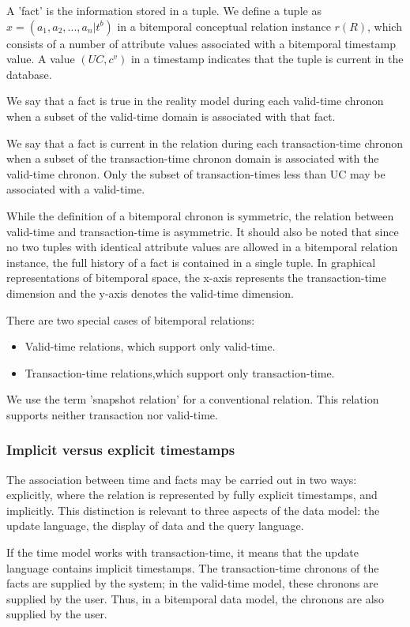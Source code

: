 A 'fact' is the information stored in a tuple. We define a tuple as $x=(a_1,a_2,...,a_n|t^b)$ in a bitemporal conceptual relation instance $r(R)$, which consists of a number of attribute values associated with a bitemporal timestamp value. A value $(UC,c^v)$ in a timestamp indicates that the tuple is current in the database.

We say that a fact is true in the reality model during each valid-time chronon when a subset of the valid-time domain is associated with that fact.

We say that a fact is current in the relation during each transaction-time chronon when a subset of the transaction-time chronon domain is associated with the valid-time chronon. Only the subset of transaction-times less than UC may be associated with a valid-time.

While the definition of a bitemporal chronon is symmetric, the relation between valid-time and transaction-time is asymmetric. It should also be noted that since no two tuples with identical attribute values are allowed in a bitemporal relation instance, the full history of a fact is contained in a single tuple. In graphical representations of bitemporal space, the x-axis represents the transaction-time dimension and the y-axis denotes the valid-time dimension.

There are two special cases of bitemporal relations:
\begin{itemize}
\item
Valid-time relations, which support only valid-time.
\item
Transaction-time relations,which support only transaction-time.
\end{itemize}
We use the term 'snapshot relation' for a conventional relation. This relation supports neither transaction nor valid-time.
\subsubsection{Implicit versus explicit timestamps}
\label{sec:implicitversusexplicittimestamps}
The association between time and facts may be carried out in two ways: explicitly, where the relation is represented by fully explicit timestamps, and implicitly. This distinction is relevant to three aspects of the data model: the update language, the display of data and the query language.

	If the time model works with transaction-time, it means that the update language contains implicit timestamps. The transaction-time chronons of the facts are supplied by the system; in the valid-time model, these chronons are supplied by the user. Thus, in a bitemporal data model, the chronons are also supplied by the user.

